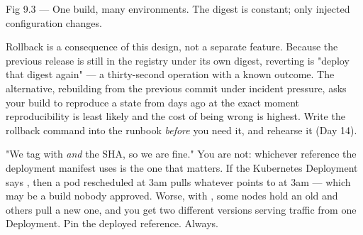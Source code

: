 \begin{wbfigure}{Fig 9.3 — One build, many environments. The digest is constant; only injected configuration changes.}
\end{wbfigure}

\begin{reliability}
Rollback is a consequence of this design, not a separate feature. Because the previous release is still in the registry under its own digest, reverting is "deploy that digest again" --- a thirty-second operation with a known outcome. The alternative, rebuilding from the previous commit under incident pressure, asks your build to reproduce a state from days ago at the exact moment reproducibility is least likely and the cost of being wrong is highest. Write the rollback command into the runbook \emph{before} you need it, and rehearse it (Day 14).
\end{reliability}

\begin{misconception}
"We tag with  \emph{and} the SHA, so we are fine." You are not: whichever reference the deployment manifest uses is the one that matters. If the Kubernetes Deployment says , then a pod rescheduled at 3am pulls whatever  points to at 3am --- which may be a build nobody approved. Worse, with , some nodes hold an old  and others pull a new one, and you get two different versions serving traffic from one Deployment. Pin the deployed reference. Always.
\end{misconception}

